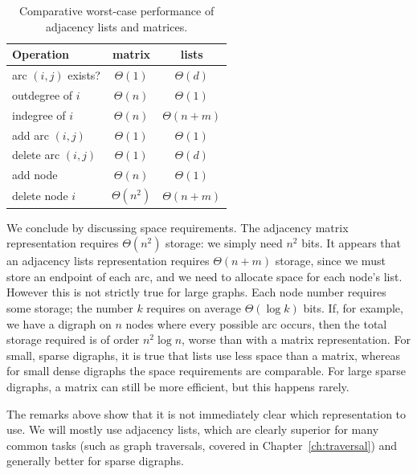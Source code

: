 \begin{table}
\caption{Comparative worst-case performance of adjacency lists and matrices.}
\label{table:list-vs-matrix}

\begin{center}
\begin{tabular}{|l|c|c|}
\hline

\textbf{Operation} & \textbf{matrix} & \textbf{lists} \\
\hline

arc $(i, j)$ exists? & $\Theta(1)$  & $\Theta(d)$ \\
\hline
outdegree  of $i$ & $\Theta(n)$ & $\Theta(1)$ \\
\hline
indegree of $i$ & $\Theta(n)$ &  $\Theta(n+m)$ \\
\hline
add arc $(i, j)$ & $\Theta(1)$ & $\Theta(1)$  \\
\hline
delete arc $(i, j)$ & $\Theta(1)$  & $\Theta(d)$  \\
\hline
add node & $\Theta(n)$ & $\Theta(1)$  \\
\hline
delete node $i$ & $\Theta(n^2)$  & $\Theta(n+m)$  \\
\hline
\end{tabular}
\end{center}
\end{table}

We conclude by discussing space requirements. The adjacency matrix
representation requires $\Theta(n^2)$ storage: we simply need $n^2$
bits. It appears that an adjacency lists representation requires
$\Theta(n+m)$ storage, since we must store an endpoint of each arc,
and we need to allocate space for each node's list. However this is
not strictly true for large graphs. Each node number requires some
storage; the number $k$ requires on average  $\Theta(\log k)$ bits. If,
for example, we have a digraph on $n$ nodes where every possible arc
occurs, then the total storage required is of order $n^2 \log n$,
worse than with a matrix representation. For small, sparse digraphs,
it is true that lists use less space than a matrix, whereas for small
dense digraphs the space requirements are comparable. For large sparse
digraphs, a matrix can still be more efficient, but this happens rarely.

The remarks above show that it is not immediately clear which
representation to use. We will mostly use adjacency lists, which are
clearly superior for many common tasks (such as graph traversals, covered
in Chapter~\ref{ch:traversal}) and generally better for sparse digraphs.

